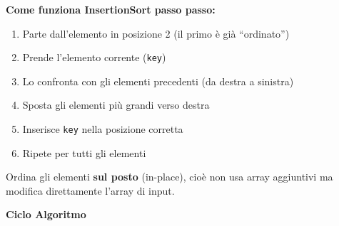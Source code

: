 \documentclass[a4paper, 11pt]{article}
\theoremstyle{definition}
\theoremstyle{remark}
\theoremstyle{remark}
\newenvironment{nota}{%
	\begin{tcolorbox}[
		colback=codebg,
		colframe=primary,
		fonttitle=\bfseries,
		title=Nota,
		left=6pt, right=6pt, top=4pt, bottom=4pt
		]
	}{%
	\end{tcolorbox}
}
\begin{document}
	\begin{softnote}
		\textbf{Come funziona InsertionSort passo passo:}
		
		\begin{enumerate}
			\item Parte dall'elemento in posizione 2 (il primo è già ``ordinato'')
			\item Prende l'elemento corrente (\texttt{key})
			\item Lo confronta con gli elementi precedenti (da destra a sinistra)
			\item Sposta gli elementi più grandi verso destra
			\item Inserisce \texttt{key} nella posizione corretta
			\item Ripete per tutti gli elementi
		\end{enumerate}
	\end{softnote}
	
	\begin{nota}
		Ordina gli elementi \textbf{sul posto} (in-place), cioè non usa array aggiuntivi ma modifica direttamente l'array di input.
	\end{nota}
	
	\textbf{Ciclo Algoritmo}
	
\end{document}
